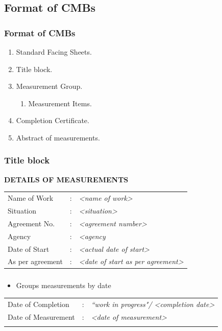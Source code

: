 \documentclass{beamer}
\begin{document}
\subsection{Format of CMBs}
\begin{frame}
  \frametitle{Format of CMBs}
  \begin{enumerate}[<+->]
    \item Standard Facing Sheets.
    \item Title block.
    \item Measurement Group.
      \begin{enumerate}
        \item Measurement Items.
      \end{enumerate}
    \item Completion Certificate.
    \item Abstract of measurements.
  \end{enumerate}
\end{frame}

\begin{frame}
  \frametitle{Title block}
  \begin{block}{}
    \begin{center}
	 		\textbf{DETAILS OF MEASUREMENTS} \\
	 	\end{center}
	 	\begin{longtabu}{p{.3\textwidth} c p{.5\textwidth}}
	 		Name of Work & : & \emph{\textless name of work\textgreater} \\
	 		Situation & : & \emph{\textless situation\textgreater}\\
	 		Agreement No. & : & \emph{\textless agreement number\textgreater}\\
	 		Agency & : & \emph{\textless agency}\\
	 		Date of Start & : & \emph{\textless actual date of start\textgreater}\\
	 		As per agreement & : & \emph{\textless date of start as per agreement\textgreater}\\
	 	\end{longtabu}
  \end{block}
\end{frame}

\begin{frame}
  \frametitle{}
  \begin{itemize}
    \item Groups measurements by date
  \end{itemize}
  \begin{block}{}
	 	\begin{longtabu}{p{.3\textwidth} c p{.5\textwidth}}
	 		Date of Completion & : & \emph{``work in progress"/ \textless completion date\textgreater} \\
	 		Date of Measurement & : & \emph{\textless date of measurement\textgreater} \\
	 		& &
	 	\end{longtabu}
  \end{block}
\end{frame}
\end{document}
